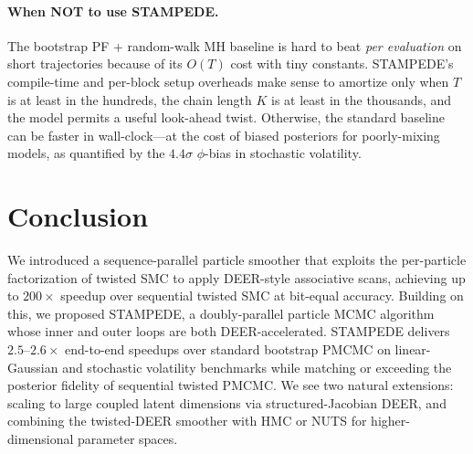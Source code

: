 \documentclass{article}
\begin{document}
\paragraph{When NOT to use STAMPEDE.} The bootstrap PF + random-walk MH baseline is hard to beat \emph{per evaluation} on short trajectories because of its $O(T)$ cost with tiny constants. STAMPEDE's compile-time and per-block setup overheads make sense to amortize only when $T$ is at least in the hundreds, the chain length $K$ is at least in the thousands, and the model permits a useful look-ahead twist. Otherwise, the standard baseline can be faster in wall-clock—at the cost of biased posteriors for poorly-mixing models, as quantified by the $4.4\sigma$ $\phi$-bias in stochastic volatility.

\section{Conclusion}
\label{sec:conclusion}

We introduced a sequence-parallel particle smoother that exploits the per-particle factorization of twisted SMC to apply DEER-style associative scans, achieving up to $200\times$ speedup over sequential twisted SMC at bit-equal accuracy. Building on this, we proposed STAMPEDE, a doubly-parallel particle MCMC algorithm whose inner and outer loops are both DEER-accelerated. STAMPEDE delivers $2.5$--$2.6\times$ end-to-end speedups over standard bootstrap PMCMC on linear-Gaussian and stochastic volatility benchmarks while matching or exceeding the posterior fidelity of sequential twisted PMCMC. We see two natural extensions: scaling to large coupled latent dimensions via structured-Jacobian DEER, and combining the twisted-DEER smoother with HMC or NUTS for higher-dimensional parameter spaces.



\end{document}
